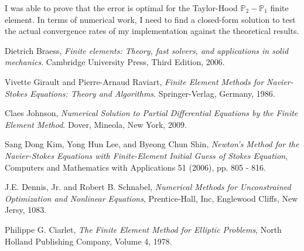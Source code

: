 \documentclass[12pt]{article}
\begin{document}
                I was able to prove that the error is optimal for the Taylor-Hood $\mathbb{P}_2 - \mathbb{P}_1$ finite element.
                In terms of numerical work, I need to find a closed-form solution to test the actual convergence rates of my implementation
                against the theoretical results.

                \clearpage

                \begin{thebibliography}{9}

                        Dietrich Braess,
                        \emph{Finite elements: Theory, fast solvers, and applications in
                        solid mechanics}.
                        Cambridge University Press,
                        Third Edition,
                        2006.

                        Vivette Girault and Pierre-Arnaud Raviart,
                        \emph{Finite Element Methods for Navier-Stokes Equations: Theory and
                        Algorithms}.
                        Springer-Verlag, Germany,
                        1986.

                        Claes Johnson,
                        \emph{Numerical Solution to Partial Differential Equations by the
                        Finite Element Method}.
                        Dover, Mineola, New York,
                        2009.

                        Sang Dong Kim, Yong Hun Lee, and Byeong Chun Shin,
                        \emph{Newton's Method for the Navier-Stokes Equations with
                        Finite-Element Initial Guess of Stokes Equation},
                        Computers and Mathematics with Applications 51 (2006),
                        pp. 805 - 816.

                        J.E. Dennis, Jr. and Robert B. Schnabel,
                        \emph{Numerical Methods for Unconstrained Optimization and Nonlinear
                        Equations},
                        Prentice-Hall, Inc, Englewood Cliffs, New Jersy, 1083.

                        Philippe G. Ciarlet,
                        \emph{The Finite Element Method for Elliptic Problems},
                        North Holland Publishing Company,
                        Volume 4,
                        1978.

                \end{thebibliography}

                
\end{document}
